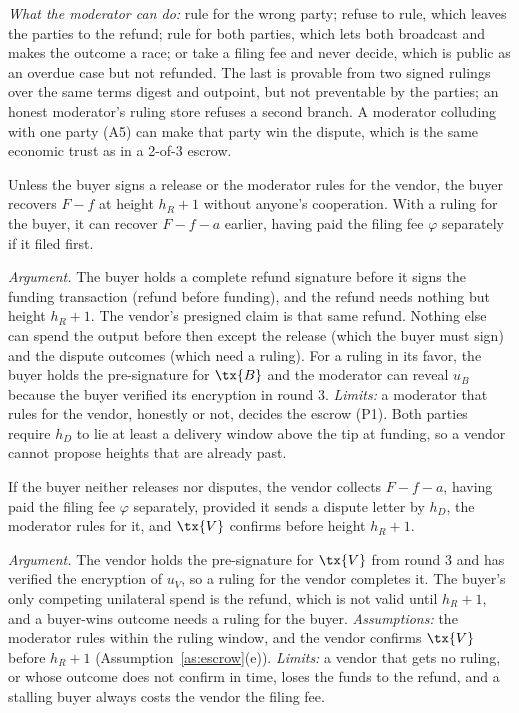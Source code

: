 \emph{What the moderator can do:} rule for the wrong party; refuse to rule, which leaves the parties to the refund; rule for both parties, which lets both broadcast and makes the outcome a race; or take a filing fee and never decide, which is public as an overdue case but not refunded. The last is provable from two signed rulings over the same terms digest and outpoint, but not preventable by the parties; an honest moderator's ruling store refuses a second branch. A moderator colluding with one party (A5) can make that party win the dispute, which is the same economic trust as in a 2-of-3 escrow.

\begin{property}
Unless the buyer signs a release or the moderator rules for the vendor, the buyer recovers $F-f$ at height $h_R+1$ without anyone's cooperation. With a ruling for the buyer, it can recover $F-f-a$ earlier, having paid the filing fee $\varphi$ separately if it filed first.
\end{property}
\noindent\emph{Argument.} The buyer holds a complete refund signature before it signs the funding transaction (refund before funding), and the refund needs nothing but height $h_R+1$. The vendor's presigned claim is that same refund. Nothing else can spend the output before then except the release (which the buyer must sign) and the dispute outcomes (which need a ruling). For a ruling in its favor, the buyer holds the pre-signature for $\tx{B}$ and the moderator can reveal $u_B$ because the buyer verified its encryption in round 3. \emph{Limits:} a moderator that rules for the vendor, honestly or not, decides the escrow (P1). Both parties require $h_D$ to lie at least a delivery window above the tip at funding, so a vendor cannot propose heights that are already past.

\begin{property}
If the buyer neither releases nor disputes, the vendor collects $F-f-a$, having paid the filing fee $\varphi$ separately, provided it sends a dispute letter by $h_D$, the moderator rules for it, and $\tx{V}$ confirms before height $h_R+1$.
\end{property}
\noindent\emph{Argument.} The vendor holds the pre-signature for $\tx{V}$ from round 3 and has verified the encryption of $u_V$, so a ruling for the vendor completes it. The buyer's only competing unilateral spend is the refund, which is not valid until $h_R+1$, and a buyer-wins outcome needs a ruling for the buyer. \emph{Assumptions:} the moderator rules within the ruling window, and the vendor confirms $\tx{V}$ before $h_R+1$ (Assumption~\ref{as:escrow}(e)). \emph{Limits:} a vendor that gets no ruling, or whose outcome does not confirm in time, loses the funds to the refund, and a stalling buyer always costs the vendor the filing fee.

